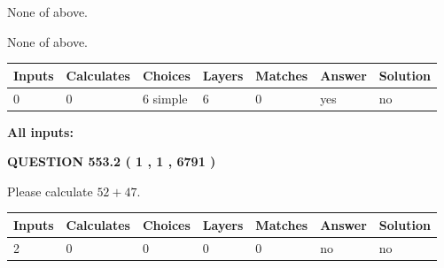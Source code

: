 \documentclass[12pt]{article}
\begin{document}
 
 None of above.
 
 
\noindent{}
 
 
 None of above.
 
 
\noindent{}
 
 
   
   
   
   
\noindent\begin{tabular}{|l|l|l|l|l|l|l|}
 \hline
Inputs & Calculates & Choices & Layers & Matches & Answer & Solution \\ \hline
 0  & 
 0  & 
 6
  simple  
  & 
 6  & 
 0  & 
  yes & 
  no 
  \\ \hline
 \end{tabular}
   
   
   
   
\noindent{}
   
   
   
   
\noindent\vspace{0.1in}\hspace{-0.08in} {\textbf{\Large{All inputs: }}}
   
   
  
\vspace{0.2in}
  
{\textbf{\Large{QUESTION
553.2 
 ( 1 , 1 , 6791 )
}}}
  
  
 
Please calculate $ %
52 +  %
47 $.
 
 
   
   
   
   
\noindent\begin{tabular}{|l|l|l|l|l|l|l|}
 \hline
Inputs & Calculates & Choices & Layers & Matches & Answer & Solution \\ \hline
 2  & 
 0  & 
 0
  & 
 0  & 
 0  & 
  no & 
  no 
  \\ \hline
 \end{tabular}
   
   
   
   
\noindent{}
   
   
   
\end{document}
